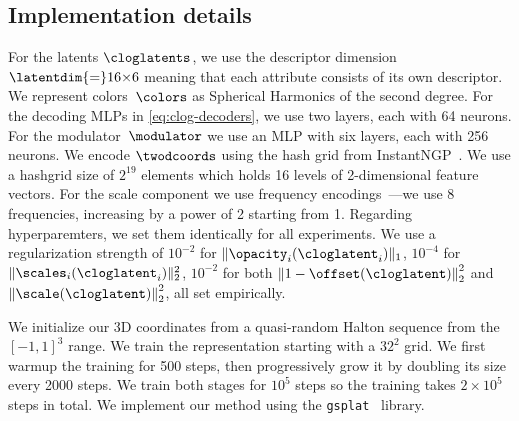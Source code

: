   \subsection{Implementation details}
    For the latents $\cloglatents$, we use the descriptor dimension
    $\latentdim{=}16{\times}6$ meaning that each attribute consists of its own
    descriptor.
    We represent colors~$\colors$ as Spherical Harmonics of the second degree.
    For the decoding MLPs in \cref{eq:clog-decoders}, we use two layers, each
    with 64 neurons.
    For the modulator~$\modulator$ we use an MLP with six layers, each with
    256 neurons.
    We encode $\twodcoords$ using the hash grid from
    InstantNGP~\cite{mueller2022instant}.
    We use a hashgrid size of $2^{19}$ elements which holds 16 levels of
    2-dimensional feature vectors.
    For the scale component we use frequency
    encodings~\cite{mildenhall2020nerf}---we use 8 frequencies, increasing by
    a power of 2 starting from 1.
    Regarding hyperparemters, we set them identically for all experiments.
    We use a regularization strength of $10^{-2}$ for
    $\|\opacity_i(\cloglatent_i)\|_1$, $10^{-4}$ for
    $\|\scales_i(\cloglatent_i)\|_2^2$, $10^{-2}$ for both $\left\|1 -
    \offset(\cloglatent)\right\|_2^2$ and
    $\left\|\scale(\cloglatent)\right\|_2^2$, all set empirically.

    We initialize our 3D coordinates from a quasi-random Halton sequence from
    the $[-1, 1]^3$ range.
    We train the representation starting with a $32^2$ grid.
    We first warmup the training for 500 steps, then progressively grow it by
    doubling its size every 2000 steps.
    We train both stages for $10^5$ steps so the training takes $2 \times
    10^5$ steps in total.
    We implement our method using the
    \texttt{gsplat}~\cite{ye2024gsplatopensourcelibrarygaussian} library.
